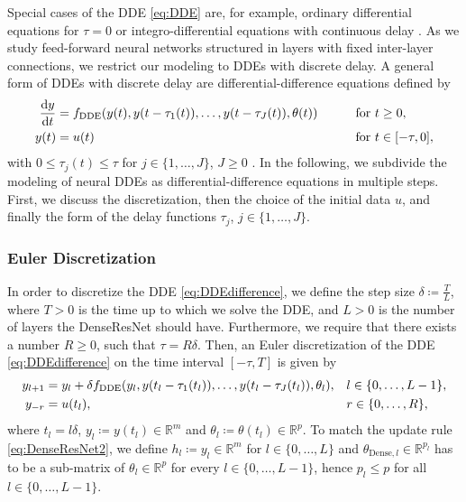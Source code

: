 \documentclass[10pt]{article}
\numberwithin{equation}{section}
\newcommand*{\dd}{\mathrm{d}}
\begin{document}
	
	Special cases of the DDE \eqref{eq:DDE} are, for example, ordinary differential equations for $\tau = 0$ or integro-differential equations with continuous delay \cite{Hale1993}. As we study feed-forward neural networks structured in layers with fixed inter-layer connections, we restrict our modeling to DDEs with discrete delay. A general form of DDEs with discrete delay are differential-difference equations defined by
	\begin{equation} \label{eq:DDEdifference}
		\begin{aligned}
			\frac{\dd y}{\dd t} &= f_\textup{DDE}(y(t),y(t-\tau_1(t)),\ldots,y(t-\tau_J(t)),\theta(t)) \qquad &&\text{for } t \geq 0, \\  
			y(t) &= u(t) &&\text{for } t \in [-\tau,0],
		\end{aligned}
	\end{equation}
	with $0 \leq \tau_j(t) \leq \tau$ for $j\in \{1,\dots,J\}$, $J \geq 0$ \cite{Hale1993}. In the following, we subdivide the modeling of neural DDEs as differential-difference equations in multiple steps. First, we discuss the discretization, then the choice of the initial data $u$, and finally the form of the delay functions $\tau_j$, $j\in \{1,\ldots,J\}$.   
	
	
	
	
	\subsubsection*{Euler Discretization}
	
	In order to discretize the DDE \eqref{eq:DDEdifference}, we define the step size $\delta\coloneqq \frac{T}{L}$, where $T>0$ is the time up to which we solve the DDE, and $L>0$ is the number of layers the DenseResNet should have. Furthermore, we require that there exists a number $R \geq 0$, such that $\tau = R\delta$. Then, an Euler discretization of the DDE \eqref{eq:DDEdifference} on the time interval $[-\tau,T]$ is given by 
	\begin{equation} \label{eq:DDEdifference1}
		\begin{aligned}
			y_{l+1} &= y_{l} + \delta f_\textup{DDE}(y_{l},y(t_l-\tau_1(t_{l})),\ldots,y(t_{l}-\tau_J(t_{l})),\theta_l), && l\in \{0,\ldots,L-1\}, \\
			y_{-r} &= u(t_l), && r\in \{0,\ldots,R\},
		\end{aligned}
	\end{equation}
	where $t_l = l\delta$, $y_l\coloneqq y(t_l) \in \mathbb{R}^m$ and $\theta_l \coloneqq \theta(t_l)\in\mathbb{R}^{p}$. To match the update rule \eqref{eq:DenseResNet2}, we define $h_l \coloneqq y_l \in \mathbb{R}^m$ for $l \in \{0,\ldots,L\}$ and $\theta_{\text{Dense},l} \in \mathbb{R}^{p_l}$ has to be a sub-matrix of $ \theta_l \in \mathbb{R}^{p}$ for every $l \in \{0,\ldots,L-1\}$, hence  $p_l \leq p$ for all $l\in\{0,\ldots,L-1\}$. 
	
\end{document}
